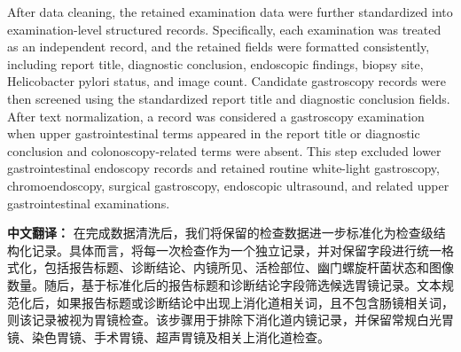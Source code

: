 \documentclass[Afour,sagev,times]{sagej}
\begin{document}
After data cleaning, the retained examination data were further standardized into examination-level structured records. Specifically, each examination was treated as an independent record, and the retained fields were formatted consistently, including report title, diagnostic conclusion, endoscopic findings, biopsy site, Helicobacter pylori status, and image count. Candidate gastroscopy records were then screened using the standardized report title and diagnostic conclusion fields. After text normalization, a record was considered a gastroscopy examination when upper gastrointestinal terms appeared in the report title or diagnostic conclusion and colonoscopy-related terms were absent. This step excluded lower gastrointestinal endoscopy records and retained routine white-light gastroscopy, chromoendoscopy, surgical gastroscopy, endoscopic ultrasound, and related upper gastrointestinal examinations.

\textbf{中文翻译：} 在完成数据清洗后，我们将保留的检查数据进一步标准化为检查级结构化记录。具体而言，将每一次检查作为一个独立记录，并对保留字段进行统一格式化，包括报告标题、诊断结论、内镜所见、活检部位、幽门螺旋杆菌状态和图像数量。随后，基于标准化后的报告标题和诊断结论字段筛选候选胃镜记录。文本规范化后，如果报告标题或诊断结论中出现上消化道相关词，且不包含肠镜相关词，则该记录被视为胃镜检查。该步骤用于排除下消化道内镜记录，并保留常规白光胃镜、染色胃镜、手术胃镜、超声胃镜及相关上消化道检查。
\end{document}
